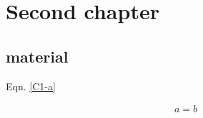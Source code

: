 


\chapter{Second chapter}

\section{material}




Eqn. \eqref{C1-a}




\begin{align}
a=b        \label{a}
\end{align}




